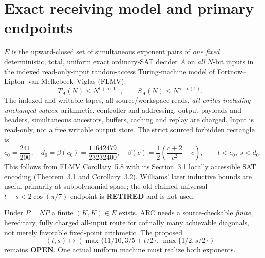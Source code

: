 \documentclass[11pt]{article}
\begin{document}
\section{Exact receiving model and primary endpoints}
$E$ is the upward-closed set of simultaneous exponent pairs of \emph{one fixed} deterministic, total, uniform exact ordinary-SAT decider $A$ on \emph{all} $N$-bit inputs in the indexed read-only-input random-access Turing-machine model of Fortnow--Lipton--van Melkebeek--Viglas (FLMV):
\[
T_A(N)\le N^{t+o(1)},\qquad S_A(N)\le N^{s+o(1)}.
\]
The indexed and writable tapes, all source/workspace reads, \emph{all writes including unchanged values}, arithmetic, controller and addressing, output payloads and headers, simultaneous ancestors, buffers, caching and replay are charged. Input is read-only, not a free writable output store. The strict sourced forbidden rectangle is
\[
c_0=\frac{241}{200},\quad
d_0=\beta(c_0)=\frac{11642479}{23232400},\quad
\beta(c)=\frac12\left(\frac{c+2}{c^2}-c\right),\qquad t<c_0,\ s<d_0.
\]
This follows from FLMV Corollary~5.8 with its Section~3.1 locally accessible SAT encoding (Theorem~3.1 and Corollary~3.2). Williams' later inductive bounds are useful primarily at subpolynomial space; the old claimed universal $t+s<2\cos(\pi/7)$ endpoint is \textbf{RETIRED} and is not used.

Under $P=NP$ a finite $(K,K)\in E$ exists. ARC needs a source-checkable \emph{finite}, hereditary, fully charged all-input route for cofinally many achievable diagonals, not merely favorable fixed-point arithmetic. The proposed
\[
(t,s)\longmapsto\left(\max\{11/10,3/5+t/2\},\,\max\{1/2,s/2\}\right)
\]
remains \textbf{OPEN}. One actual uniform machine must realize both exponents.
\end{document}
